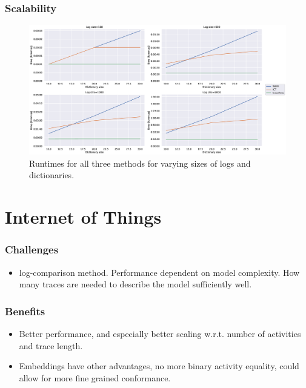 \documentclass{beamer}
\begin{document}
	
	\begin{frame}
		\frametitle{Scalability}
		\begin{figure}
			\includegraphics[width=1\textwidth]{figures/scaling}
			\caption{Runtimes for all three methods for varying sizes of logs and dictionaries.}
			\label{fig:scalability}
		\end{figure}
	\end{frame}
	
	\section{Internet of Things}
	\begin{frame}
		\frametitle{Challenges}
		\begin{itemize}
			\item log-comparison method. Performance dependent on model complexity. How many traces are needed to describe the model sufficiently well.
		\end{itemize}
	\end{frame}
	
	\begin{frame}
		\frametitle{Benefits}
		\begin{itemize}
			\item Better performance, and especially better scaling w.r.t. number of activities and trace length.
			\item Embeddings have other advantages, no more binary activity equality, could allow for more fine grained conformance.
		\end{itemize}
	\end{frame}
	
\end{document}
